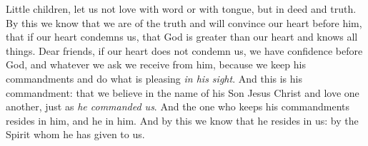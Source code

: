 \begin{biblechapter}
\verse Little children, let us not love with word or with tongue, but in deed and truth.
\verse By this we know that we are of the truth and will convince our heart before him,
\verse that if our heart condemns us, that God is greater than our heart and knows all things.
\verse Dear friends, if our heart does not condemn us, we have confidence before God,
\verse and whatever we ask we receive from him, because we keep his commandments and do what is pleasing \textit{in his sight}.
\verse And this is his commandment: that we believe in the name of his Son Jesus Christ and love one another, just as \textit{he commanded us}.
\verse And the one who keeps his commandments resides in him, and he in him. And by this we know that he resides in us: by the Spirit whom he has given to us.
\end{biblechapter}

